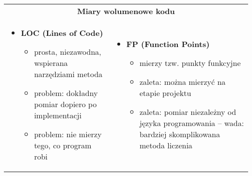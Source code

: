 \documentclass[../main.tex]{subfiles}
\begin{document}
    \begin{table}[H]
        \begin{center}
            \begin{tabular}{p{8cm} p{8cm}}
                \multicolumn{2}{c}{\textbf{Miary wolumenowe kodu}}\\

                \begin{itemize}
                    \item \textbf{LOC (Lines of Code)}
                    \begin{itemize}
                        \item prosta, niezawodna, wspierana narzędziami metoda
                        \item problem: dokładny pomiar dopiero po implementacji
                        \item problem: nie mierzy tego, co program robi
                    \end{itemize}
                \end{itemize}
                &
                \begin{itemize}
                    \item \textbf{FP (Function Points)}
                    \begin{itemize}
                        \item mierzy tzw. punkty funkcyjne
                        \item zaleta: można mierzyć na etapie projektu
                        \item zaleta: pomiar niezależny od języka programowania – wada: bardziej skomplikowana metoda liczenia
                    \end{itemize}
                \end{itemize}
            \end{tabular}
        \end{center}
    \end{table}
\end{document}
